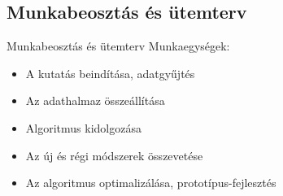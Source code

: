 
\renewcommand\sfdefault{phv}
\renewcommand\mddefault{mc}
\renewcommand\bfdefault{bc}
\sffamily

\subsection{Munkabeosztás és ütemterv}

\begin{frame}{Munkabeosztás és ütemterv}
Munkaegységek:
\begin{itemize}
  \item {A kutatás beindítása, adatgyűjtés}
  \item {Az adathalmaz összeállítása}
  \item {Algoritmus kidolgozása}
  \item {Az új és régi módszerek összevetése}
  \item {Az algoritmus optimalizálása, prototípus-fejlesztés}
  \end{itemize}
\end{frame}


